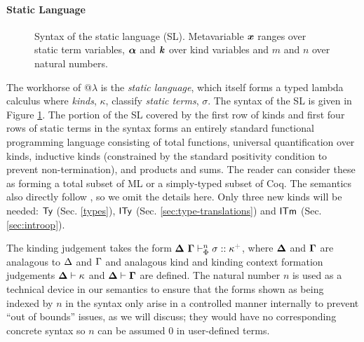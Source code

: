 \documentclass[10pt,preprint]{sigplanconf}
\newcommand{\moutput}{^{\color{gray}+}}
\begin{document}
\paragraph{Static Language}
\begin{figure}[t]
\small
\hspace{-5px}
\caption{Syntax of the static language (SL). Metavariable ${\textbf{\textit{x}}}$ ranges over static term variables, $\boldsymbol{\alpha}$ and $\textbf{\textit{k}}$ over kind variables and $m$ and $n$ over natural numbers.}\vspace{-5px}
\label{syntax-SL}
\end{figure}
The workhorse of @$\lambda$ is the \emph{static language}, which itself forms a typed lambda calculus where 
\emph{kinds}, $\kappa$, classify \emph{static terms}, $\sigma$.  The syntax of the SL is given in Figure \ref{syntax-SL}. The portion of the SL covered by the first row of kinds and first four rows of static terms in the syntax forms an entirely standard  functional programming language consisting of total functions, universal quantification over kinds, inductive kinds (constrained by the standard positivity condition to prevent non-termination), and products and sums. The reader can consider these as forming a total subset of ML or a simply-typed subset of Coq. The semantics also directly follow \cite{pfpl}, so we  omit the details here.  Only three new  kinds will be needed: ${\sf Ty}$ (Sec. \ref{types}), ${\sf ITy}$ (Sec. \ref{sec:type-translations}) and ${\sf ITm}$ (Sec. \ref{sec:introop}). 

The kinding judgement takes the form $\sofkX{\st}{\kappa\moutput}$, where $\boldsymbol\Delta$ and $\boldsymbol\Gamma$ are analagous to $\Delta$ and $\Gamma$ and analagous kind and kinding context formation judgements $\boldsymbol\Delta \vdash \kappa$ and $\boldsymbol\Delta \vdash \boldsymbol\Gamma$ are  defined. The natural number $n$ is used as a technical device in our semantics to ensure that the forms shown as being indexed by $n$ in the syntax only arise in a controlled manner internally to prevent ``out of bounds'' issues, as we will discuss; they would have no corresponding concrete syntax so $n$ can be assumed $0$ in user-defined terms. 
\end{document}
